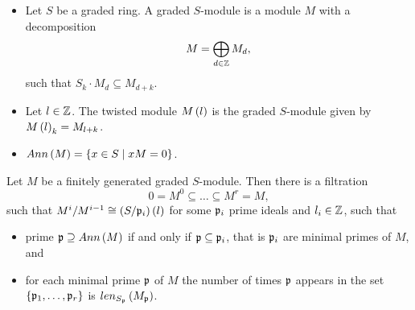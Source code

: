 \begin{definition}
\hfill
\begin{itemize}
\item Let $ S $ be a graded ring. A graded $ S $-module is a module $ M $ with a decomposition
$$ M = \bigoplus_{d \in \mathbb{Z}} M_d, $$
such that $ S_k \cdot M_d \subseteq M_{d + k} $.
\item Let $ l \in \mathbb{Z} $. The twisted module $ M\left( l \right) $ is the graded $ S $-module given by $ M\left( l \right)_k = M_{l + k} $.
\item $ Ann\left( M \right) = \left\{ x \in S \mid xM = 0 \right\} $.
\end{itemize}
\end{definition}

\begin{theorem}
Let $ M $ be a finitely generated graded $ S $-module. Then there is a filtration
$$ 0 = M^0 \subseteq \dots \subseteq M^r = M, $$
such that $ M^i / M^{i - 1} \cong \left( S / \mathfrak{p}_i \right)\left( l \right) $ for some $ \mathfrak{p}_i $ prime ideals and $ l_i \in \mathbb{Z} $, such that
\begin{itemize}
\item prime $ \mathfrak{p} \supseteq Ann\left( M \right) $ if and only if $ \mathfrak{p} \subseteq \mathfrak{p}_i $, that is $ \mathfrak{p}_i $ are minimal primes of $ M $, and
\item for each minimal prime $ \mathfrak{p} $ of $ M $ the number of times $ \mathfrak{p} $ appears in the set $ \left\{ \mathfrak{p}_1, \dots, \mathfrak{p}_r \right\} $ is $ len_{S_{\mathfrak{p}}}\left( M_{\mathfrak{p}} \right) $.
\end{itemize}
\end{theorem}

